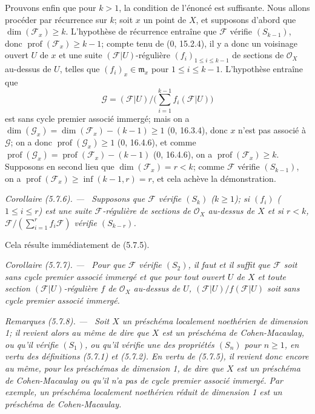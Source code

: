 \documentclass[10pt,oneside]{book}
\newcommand{\oldpage}[2][]{%
  \setcounter{footnote}{0}%
  \marginpar{\scriptsize\textbf{#1}~|~#2}\ignorespaces}
\newenvironment{corollary}[1][]{%
  \par\medskip\noindent\itshape Corollaire (#1). ---\ }{\par}
\newenvironment{remarks}[1][]{%
  \par\medskip\noindent\itshape Remarques (#1). ---\ }{\par}
\begin{document}
Prouvons enfin que pour $k>1$, la condition de l'énoncé est suffisante. Nous
allons procéder par récurrence sur $k$; soit $x$ un point de $X$, et
supposons d'abord que $\dim(\mathscr F_x)\geq k$. L'hypothèse de récurrence
entraîne que $\mathscr F$ vérifie $(S_{k-1})$, donc
$\operatorname{prof}(\mathscr F_x)\geq k-1$; compte tenu de (0, 15.2.4), il
y a donc un voisinage ouvert $U$ de $x$ et une suite
$(\mathscr F|U)$-régulière $(f_i)_{1\leq i\leq k-1}$ de sections de
$\mathcal O_X$ au-dessus de $U$, telles que $(f_i)_x\in\mathfrak m_x$ pour
$1\leq i\leq k-1$. L'hypothèse entraîne que
\[
\mathscr G=(\mathscr F|U)\big/\Big(\sum_{i=1}^{k-1}
f_i(\mathscr F|U)\Big)
\]
est sans cycle premier associé immergé; mais on a
$\dim(\mathscr G_x)=\dim(\mathscr F_x)-(k-1)\geq1$ (0, 16.3.4), donc $x$
n'est pas associé à $\mathscr G$; on a donc
$\operatorname{prof}(\mathscr G_x)\geq1$ (0, 16.4.6), et comme
$\operatorname{prof}(\mathscr G_x)=\operatorname{prof}(\mathscr F_x)-(k-1)$
(0, 16.4.6), on a $\operatorname{prof}(\mathscr F_x)\geq k$. Supposons en
second lieu que $\dim(\mathscr F_x)=r<k$; comme $\mathscr F$ vérifie
$(S_{k-1})$, on a
$\operatorname{prof}(\mathscr F_x)\geq\inf(k-1,r)=r$, et cela achève la
démonstration.

\begin{corollary}[5.7.6]
\label{IV.2.s5.7.6-fr}
Supposons que $\mathscr F$ vérifie $(S_k)$ ($k\geq1$); si
$(f_i)$ ($1\leq i\leq r$) est une suite $\mathscr F$-régulière de sections
de $\mathcal O_X$ au-dessus de $X$ et si $r<k$,
$\mathscr F/(\sum_{i=1}^r f_i\mathscr F)$ vérifie $(S_{k-r})$.
\end{corollary}

Cela résulte immédiatement de (5.7.5).

\begin{corollary}[5.7.7]
\label{IV.2.s5.7.7-fr}
Pour que $\mathscr F$ vérifie $(S_2)$, il faut et il suffit que $\mathscr F$
soit sans cycle premier associé immergé et que pour tout ouvert $U$ de $X$
et toute section $(\mathscr F|U)$-régulière $f$ de $\mathcal O_X$ au-dessus
de $U$, $(\mathscr F|U)/f(\mathscr F|U)$ soit sans cycle premier associé
immergé.
\end{corollary}

\oldpage[IV-2]{106}

\begin{remarks}[5.7.8]
\label{IV.2.s5.7.8-fr}
Soit $X$ un préschéma localement noethérien de dimension 1; il revient alors
au même de dire que $X$ est un préschéma de Cohen-Macaulay, ou qu'il vérifie
$(S_1)$, ou qu'il vérifie une des propriétés $(S_n)$ pour $n\geq1$, en vertu
des définitions (5.7.1) et (5.7.2). En vertu de (5.7.5), il revient donc
encore au même, pour les préschémas de dimension 1, de dire que $X$ est un
préschéma de Cohen-Macaulay ou qu'il n'a pas de cycle premier associé
immergé. Par exemple, un préschéma localement noethérien réduit de dimension
1 est un préschéma de Cohen-Macaulay.
\end{remarks}
\end{document}
